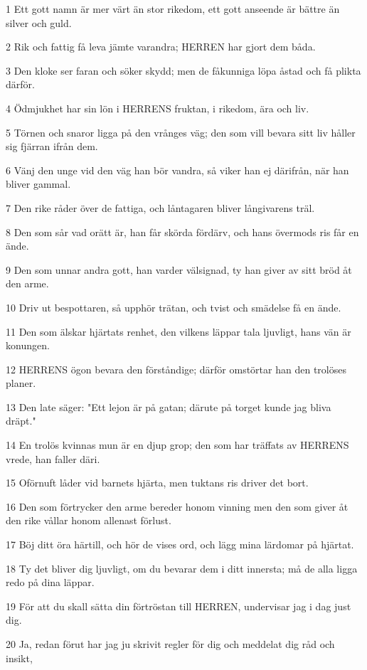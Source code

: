 \par 1 Ett gott namn är mer värt än stor rikedom, ett gott anseende är bättre än silver och guld.
\par 2 Rik och fattig få leva jämte varandra; HERREN har gjort dem båda.
\par 3 Den kloke ser faran och söker skydd; men de fåkunniga löpa åstad och få plikta därför.
\par 4 Ödmjukhet har sin lön i HERRENS fruktan, i rikedom, ära och liv.
\par 5 Törnen och snaror ligga på den vrånges väg; den som vill bevara sitt liv håller sig fjärran ifrån dem.
\par 6 Vänj den unge vid den väg han bör vandra, så viker han ej därifrån, när han bliver gammal.
\par 7 Den rike råder över de fattiga, och låntagaren bliver långivarens träl.
\par 8 Den som sår vad orätt är, han får skörda fördärv, och hans övermods ris får en ände.
\par 9 Den som unnar andra gott, han varder välsignad, ty han giver av sitt bröd åt den arme.
\par 10 Driv ut bespottaren, så upphör trätan, och tvist och smädelse få en ände.
\par 11 Den som älskar hjärtats renhet, den vilkens läppar tala ljuvligt, hans vän är konungen.
\par 12 HERRENS ögon bevara den förståndige; därför omstörtar han den trolöses planer.
\par 13 Den late säger: "Ett lejon är på gatan; därute på torget kunde jag bliva dräpt."
\par 14 En trolös kvinnas mun är en djup grop; den som har träffats av HERRENS vrede, han faller däri.
\par 15 Oförnuft låder vid barnets hjärta, men tuktans ris driver det bort.
\par 16 Den som förtrycker den arme bereder honom vinning men den som giver åt den rike vållar honom allenast förlust.
\par 17 Böj ditt öra härtill, och hör de vises ord, och lägg mina lärdomar på hjärtat.
\par 18 Ty det bliver dig ljuvligt, om du bevarar dem i ditt innersta; må de alla ligga redo på dina läppar.
\par 19 För att du skall sätta din förtröstan till HERREN, undervisar jag i dag just dig.
\par 20 Ja, redan förut har jag ju skrivit regler för dig och meddelat dig råd och insikt,
